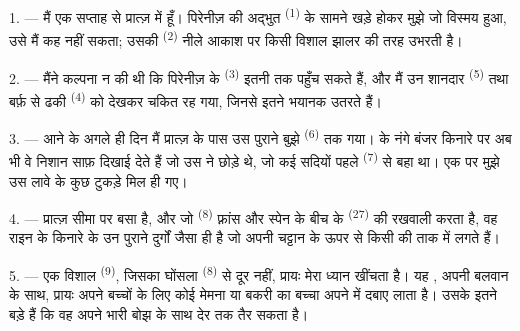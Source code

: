 
\VUsaut{4.0mm}
\VUsaut{3.0mm}

\VUsaut{3.0mm}

\VUsaut{3.0mm}

1. --- मैं एक सप्ताह से प्रात्ज़ में हूँ। पिरेनीज़ की अद्भुत 
\textsuperscript{(1)} के सामने खड़े होकर मुझे जो विस्मय हुआ, उसे मैं कह नहीं
सकता; उसकी  \textsuperscript{(2)} नीले आकाश पर किसी विशाल झालर
की तरह उभरती है।

2. --- मैंने कल्पना न की थी कि पिरेनीज़ के  \textsuperscript{(3)}
इतनी  तक पहुँच सकते हैं, और मैं उन शानदार 
\textsuperscript{(5)} तथा बर्फ़ से ढकी  \textsuperscript{(4)} को
देखकर चकित रह गया, जिनसे इतने भयानक  उतरते हैं।

\VUsaut{3.0mm}
\VUsaut{3.0mm}

3. --- आने के अगले ही दिन मैं प्रात्ज़ के पास उस पुराने बुझे 
\textsuperscript{(6)} तक गया।  के नंगे बंजर किनारे पर अब भी वे निशान
साफ़ दिखाई देते हैं जो उस  ने छोड़े थे, जो कई सदियों पहले
 \textsuperscript{(7)} से बहा था। एक  पर मुझे उस
लावे के कुछ टुकड़े मिल ही गए।

4. --- प्रात्ज़ सीमा पर बसा है, और जो  \textsuperscript{(8)} फ़्रांस
और स्पेन के बीच के  \textsuperscript{(27)} की रखवाली करता है, वह
राइन के किनारे के उन पुराने दुर्गों जैसा ही है जो अपनी चट्टान के ऊपर से किसी
 की ताक में लगते हैं।

5. --- एक विशाल  \textsuperscript{(9)}, जिसका घोंसला
 \textsuperscript{(8)} से दूर नहीं, प्रायः मेरा ध्यान खींचता है। यह
, अपनी बलवान  के साथ, प्रायः अपने बच्चों के लिए
कोई मेमना या बकरी का बच्चा अपने  में दबाए लाता है। उसके
 इतने बड़े हैं कि वह अपने भारी बोझ के साथ देर तक तैर सकता है।

